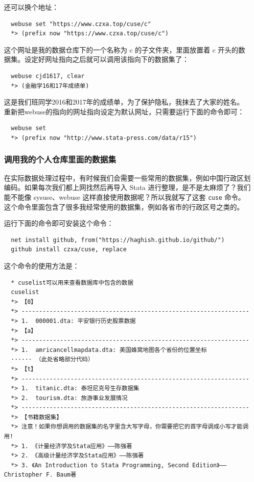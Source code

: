 \documentclass[cn,fancy,blue,11pt]{elegantbook}
\begin{document}
还可以换个地址：

\begin{lstlisting}
  webuse set "https://www.czxa.top/cuse/c"
  *> (prefix now "https://www.czxa.top/cuse/c")
\end{lstlisting}

这个网址是我的数据仓库下的一个名称为 c 的子文件夹，里面放置着 c 开头的数据集。设定好网址指向之后就可以调用该指向下的数据集了：

\begin{lstlisting}
  webuse cjd1617, clear
  *> (金融学16和17年成绩单)
\end{lstlisting}

这是我们班同学2016和2017年的成绩单，为了保护隐私，我抹去了大家的姓名。
重新把webuse的指向的网址指向设定为默认网址，只需要运行下面的命令即可：

\begin{lstlisting}
  webuse set
  *> (prefix now "http://www.stata-press.com/data/r15")
\end{lstlisting}

\subsubsection{调用我的个人仓库里面的数据集}
在实际数据处理过程中，有时候我们会需要一些常用的数据集，例如中国行政区划编码。如果每次我们都上网找然后再导入 Stata 进行整理，是不是太麻烦了？我们能不能像 sysuse、webuse 这样直接使用数据呢？所以我就写了这套 \lstinline{cuse} 命令。这个命令里面包含了很多我经常使用的数据集，例如各省市的行政区号之类的。

运行下面的命令即可安装这个命令：

\begin{lstlisting}
  net install github, from("https://haghish.github.io/github/")
  github install czxa/cuse, replace
\end{lstlisting}

这个命令的使用方法是：

\begin{lstlisting}
  * cuselist可以用来查看数据库中包含的数据
  cuselist
  *> 【0】
  *> -----------------------------------------------------------------
  *> 1.  000001.dta: 平安银行历史股票数据
  *> 【a】
  *> -----------------------------------------------------------------
  *> 1.  amricancellmapdata.dta: 美国蜂窝地图各个省份的位置坐标
  ······ （此处省略部分代码）
  *> 【t】
  *> -----------------------------------------------------------------
  *> 1.  titanic.dta: 泰坦尼克号生存数据集
  *> 2.  tourism.dta: 旅游事业发展情况
  *> -----------------------------------------------------------------
  *> 【书籍数据集】
  *> 注意！如果你想调用的数据集的名字里含大写字母，你需要把它的首字母调成小写才能调用!
  *> 1. 《计量经济学及Stata应用》——陈强著
  *> 2. 《高级计量经济学及Stata应用》——陈强著
  *> 3. 《An Introduction to Stata Programming, Second Edition》——Christopher F. Baum著
\end{lstlisting}
\end{document}
